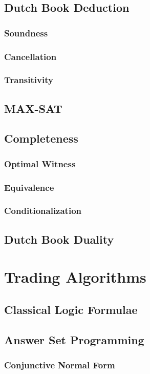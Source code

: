 \documentclass[a4paper,11pt]{book}
\begin{document}
\section{Dutch Book Deduction}
\subsection{Soundness}
\subsection{Cancellation}
\subsection{Transitivity}
\section{MAX-SAT}
\section{Completeness}
\subsection{Optimal Witness}
\subsection{Equivalence}
\subsection{Conditionalization}
\section{Dutch Book Duality}

\chapter{Trading Algorithms}
\section{Classical Logic Formulae}
\section{Answer Set Programming}
\subsection{Conjunctive Normal Form}
\end{document}
